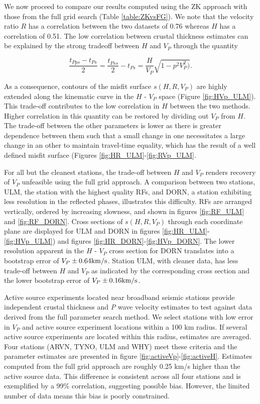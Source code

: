 \documentclass[draft, 12pt]{article}
\begin{document}
We now proceed to compare our results computed using the ZK approach with those from the full grid search (Table \ref{table:ZKvsFG}). We note that the velocity ratio $R$ has a correlation between the two datasets of 0.76 whereas $H$ has a correlation of 0.51. The low correlation between crustal thickness estimates can be explained by the strong tradeoff between $H$ and $V_P$ through the quantity

$$\frac{t_{Pps}-t_{Ps}}{2}=\frac{t_{Pss}}{2} - t_{Ps}= \frac{H}{V_P}\sqrt{1-p^2V^2_P)}.$$

\noindent As a consequence, contours of the misfit surface $s(H,R,V_P)$ are highly extended along the kinematic curve in the $H$ - $V_P$ space (Figure \ref{fig:HVp_ULM}). This trade-off contributes to the low correlation in $H$ between the two methods. Higher correlation in this quantity can be restored by dividing out $V_P$ from $H$. The trade-off between the other parameters is lower as there is greater dependence between them such that a small change in one necessitates a large change in an other to maintain travel-time equality, which has the result of a well defined misfit surface (Figures \ref{fig:HR_ULM}-\ref{fig:RVp_ULM}.

For all but the cleanest stations, the trade-off between $H$ and $V_P$ renders recovery of $V_P$ unfeasible using the full grid approach. A comparison between two stations, ULM, the station with the highest quality RFs, and DORN, a station exhibiting less resolution in the reflected phases, illustrates this difficulty. RFs are arranged vertically, ordered by increasing slowness, and shown in figures \ref{fig:RF_ULM} and \ref{fig:RF_DORN}. Cross sections of $s(H,R,V_P)$ through each coordinate plane are displayed for ULM and DORN in figures \ref{fig:HR_ULM}-\ref{fig:HVp_ULM}) and figures \ref{fig:HR_DORN}-\ref{fig:HVp_DORN}. The lower resolution apparent in the $H$ - $V_P$ cross section for DORN translates into a bootstrap error of $V_P \pm 0.64 {\rm km/s}$. Station ULM, with cleaner data, has less trade-off between $H$ and $V_P$ as indicated by the corresponding cross section and the lower bootstrap error of $V_P \pm 0.16 {\rm km/s}$.

Active source experiments located near broadband seismic stations provide independent crustal thickness and {\it P} wave velocity estimates to test against data derived from the full parameter search method. We select stations with low error in $V_P$ and active source experiment locations within a 100 km radius. If several active source experiments are located within this radius, estimates are averaged. Four stations (ARVN, TYNO, ULM and WHY) meet these criteria and the parameter estimates are presented in figure \ref{fig:activeVp}-\ref{fig:activeH}. Estimates computed from the full grid approach are roughly 0.25 km/s higher than the active source data. This difference is consistent across all four stations and is exemplified by a 99\% correlation, suggesting possible bias. However, the limited number of data means this bias is poorly constrained.
\end{document}

